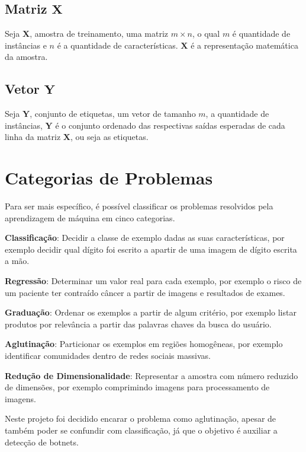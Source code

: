 \subsection{Matriz \(\mathbf{X}\)}
Seja \(\mathbf{X}\), amostra de treinamento, uma matriz \(m \times n\), o qual \(m\) é quantidade de instâncias e \(n\) é a quantidade de características. \(\mathbf{X}\) é a representação matemática da amostra.

\subsection{Vetor \(\mathbf{Y}\)}
Seja \(\mathbf{Y}\), conjunto de etiquetas, um vetor de tamanho \(m\), a quantidade de instâncias, \(\mathbf{Y}\) é o conjunto ordenado das respectivas saídas esperadas de cada linha da matriz \(\mathbf{X}\), ou seja as etiquetas.


\section{Categorias de Problemas}

Para ser mais específico, é possível classificar os problemas resolvidos pela aprendizagem de máquina em cinco categorias\cite{mohri2012foundations}.

\begin{description}
\item \textbf{Classificação}: Decidir a classe de exemplo dadas as suas características, por exemplo decidir qual dígito foi escrito a apartir de uma imagem de dígito escrita a mão.
\item \textbf{Regressão}: Determinar um valor real para cada exemplo, por exemplo o risco de um paciente ter contraído câncer a partir de imagens e resultados de exames.
\item \textbf{Graduação}: Ordenar os exemplos a partir de algum critério, por exemplo listar produtos por relevância a partir das palavras chaves da busca do usuário.
\item \textbf{Aglutinação}: Particionar os exemplos em regiões homogêneas, por exemplo identificar comunidades dentro de redes sociais massivas.
\item \textbf{Redução de Dimensionalidade}: Representar a amostra com número reduzido de dimensões, por exemplo comprimindo imagens para processamento de imagens.
\end{description}

Neste projeto foi decidido encarar o problema como aglutinação, apesar de também poder se confundir com classificação, já que o objetivo é auxiliar a detecção de botnets.

